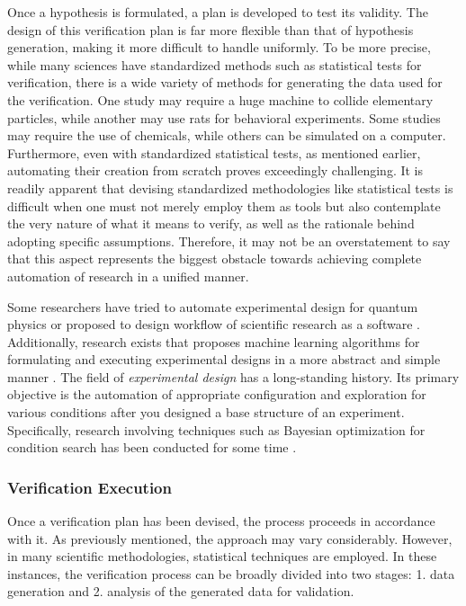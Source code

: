 \documentclass{book}
\begin{document}
Once a hypothesis is formulated, a plan is developed to test its validity. The design of this verification plan is far more flexible than that of hypothesis generation, making it more difficult to handle uniformly. To be more precise, while many sciences have standardized methods such as statistical tests for verification, there is a wide variety of methods for generating the data used for the verification. One study may require a huge machine to collide elementary particles, while another may use rats for behavioral experiments. Some studies may require the use of chemicals, while others can be simulated on a computer. Furthermore, even with standardized statistical tests, as mentioned earlier, automating their creation from scratch proves exceedingly challenging. It is readily apparent that devising standardized methodologies like statistical tests is difficult when one must not merely employ them as tools but also contemplate the very nature of what it means to verify, as well as the rationale behind adopting specific assumptions. Therefore, it may not be an overstatement to say that this aspect represents the biggest obstacle towards achieving complete automation of research in a unified manner.

Some researchers have tried to automate experimental design for quantum physics \cite{ruiz2022digital} or proposed to design workflow of scientific research as a software \cite{goble2020fair}. Additionally, research exists that proposes machine learning algorithms for formulating and executing experimental designs in a more abstract and simple manner \cite{herrmann2022learning}. The field of \textit{experimental design} has a long-standing history. Its primary objective is the automation of appropriate configuration and exploration for various conditions after you designed a base structure of an experiment. Specifically, research involving techniques such as Bayesian optimization for condition search has been conducted for some time \cite{chaloner1995bayesian,shahriari2015taking}.

\subsubsection{Verification Execution}

Once a verification plan has been devised, the process proceeds in accordance with it. As previously mentioned, the approach may vary considerably. However, in many scientific methodologies, statistical techniques are employed. In these instances, the verification process can be broadly divided into two stages: 1. data generation and 2. analysis of the generated data for validation.
\end{document}
